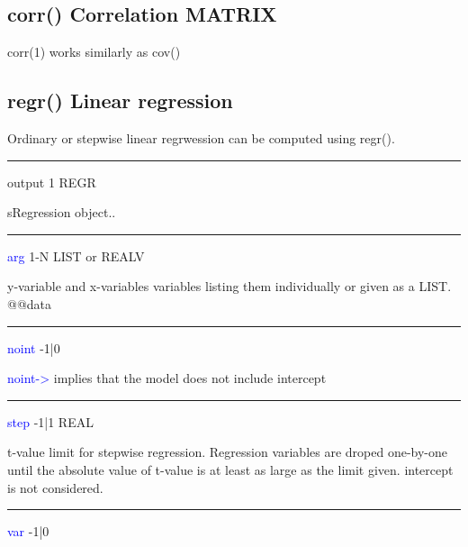 \subsection{\textcolor{VioletRed}{corr}() Correlation MATRIX}
\label{corr}
\textcolor{VioletRed}{corr}(1) works similarly as \textcolor{VioletRed}{cov}()
\subsection{\textcolor{VioletRed}{regr}() Linear regression}
\label{regr}
Ordinary or stepwise linear regrwession can be computed using \textcolor{VioletRed}{regr}().

\vspace{0.3cm}
\hrule
\vspace{0.3cm}
\noindent output \tabto{3cm} 1 \tabto{5cm}  REGR \tabto{7cm}
\begin{changemargin}{3cm}{0cm}
\noindent  sRegression object..
\end{changemargin}
\vspace{0.3cm}
\hrule
\vspace{0.3cm}
\noindent \textcolor{blue}{arg} \tabto{3cm}  1-N \tabto{5cm}  LIST or REALV \tabto{7cm}
\begin{changemargin}{3cm}{0cm}
\noindent  y-variable and x-variables variables listing them
individually or given as a LIST.
@@data
\end{changemargin}
\vspace{0.3cm}
\hrule
\vspace{0.3cm}
\noindent \textcolor{blue}{noint} \tabto{3cm} -1|0 \tabto{5cm}    \tabto{7cm}
\begin{changemargin}{3cm}{0cm}
\noindent  \textcolor{blue}{noint->} implies that the model does not include intercept
\end{changemargin}
\vspace{0.3cm}
\hrule
\vspace{0.3cm}
\noindent \textcolor{blue}{step} \tabto{3cm} -1|1  \tabto{5cm}  REAL \tabto{7cm}
\begin{changemargin}{3cm}{0cm}
\noindent  t-value limit for stepwise regression. Regression variables are droped one-by-one
until the absolute value of t-value is at least as large as the limit given.
intercept is not considered.
\end{changemargin}
\vspace{0.3cm}
\hrule
\vspace{0.3cm}
\noindent \textcolor{blue}{var} \tabto{3cm} -1|0 \tabto{5cm}    \tabto{7cm}
